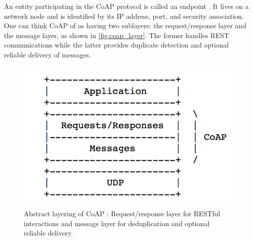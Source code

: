 An entity participating in the CoAP protocol is called an endpoint \autocite{coap_protocol}. It lives on a network node and is identified by its IP address, port, and security association. One can think CoAP of as having two sublayers: the request/response layer and the message layer, as shown in \autoref{fig:coap_layer}. The former handles REST communications while the latter provides duplicate detection and optional reliable delivery of messages. 



\begin{figure}[!htbp]
\centering
\includegraphics[scale = 0.55]{coap_layer.png}
\caption[Abstract layering of CoAP]{Abstract layering of CoAP \autocite{coap_protocol}: Request/response layer for RESTful interactions and message layer for deduplication and optional reliable delivery.}
\label{fig:coap_layer}
\end{figure}



